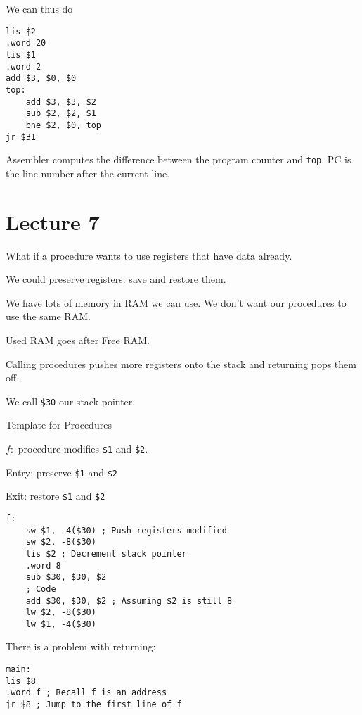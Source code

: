 \documentclass{article}
\begin{document}
We can thus do
\begin{tcolorbox}
\begin{verbatim}
lis $2
.word 20
lis $1
.word 2
add $3, $0, $0
top:
    add $3, $3, $2
    sub $2, $2, $1
    bne $2, $0, top
jr $31
\end{verbatim}
\end{tcolorbox}

Assembler computes the difference between the program counter and
\texttt{top}. PC is the line number after the current line.

\section{Lecture 7}\label{lecture-7}

What if a procedure wants to use registers that have data already.

We could preserve registers: save and restore them.

We have lots of memory in RAM we can use. We don't want our procedures
to use the same RAM.

Used RAM goes after Free RAM.

Calling procedures pushes more registers onto the stack and returning
pops them off.

We call \texttt{\$30} our stack pointer.

Template for Procedures

\(f:\) procedure modifies \texttt{\$1} and \texttt{\$2}.

Entry: preserve \texttt{\$1} and \texttt{\$2}

Exit: restore \texttt{\$1} and \texttt{\$2}

\begin{tcolorbox}
\begin{verbatim}
f:
    sw $1, -4($30) ; Push registers modified
    sw $2, -8($30)
    lis $2 ; Decrement stack pointer
    .word 8
    sub $30, $30, $2
    ; Code
    add $30, $30, $2 ; Assuming $2 is still 8
    lw $2, -8($30)
    lw $1, -4($30)
\end{verbatim}
\end{tcolorbox}

There is a problem with returning:

\begin{tcolorbox}

\begin{verbatim}
main:
lis $8
.word f ; Recall f is an address
jr $8 ; Jump to the first line of f
\end{verbatim}
\end{tcolorbox}
\end{document}
